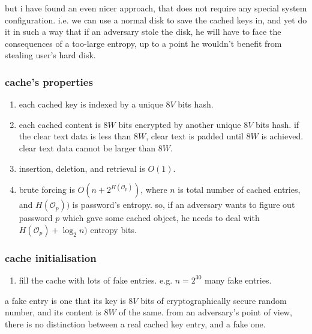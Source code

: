 \documentclass[twocolumn]{article}
\begin{document}
but i have found an even nicer approach, that does not require any special
system configuration.  i.e. we can use a normal disk to save the cached
keys in, and yet do it in such a way that if an adversary stole the disk,
he will have to face the consequences of a too-large entropy, up to a point
he wouldn't benefit from stealing user's hard disk.

\subsubsection{cache's properties}
\begin{enumerate}
    \item each cached key is indexed by a unique $8V$ bits hash.

    \item each cached content is $8W$ bits encrypted by another unique $8V$
    bits hash.  if the clear text data is less than $8W$, clear text is
    padded until $8W$ is achieved.  clear text data cannot be larger than
    $8W$.

    \item insertion, deletion, and retrieval is $O(1)$.

    \item brute forcing is $O(n + 2^{H(\mathcal{O}_p)})$, where $n$ is
    total number of cached entries, and $H(\mathcal{O}_p))$ is password's
    entropy.  so, if an adversary wants to figure out password $p$ which
    gave some cached object, he needs to deal with $H(\mathcal{O}_p) +
    \log_2 n)$ entropy bits.
\end{enumerate}

\subsubsection{cache initialisation}
\begin{enumerate}
    \item fill the cache with lots of fake entries.  e.g. $n=2^{30}$ many
    fake entries.
\end{enumerate}

a fake entry is one that its key is $8V$ bits of cryptographically secure
random number, and its content is $8W$ of the same.  from an adversary's
point of view, there is no distinction between a real cached key entry, and
a fake one.
\end{document}
